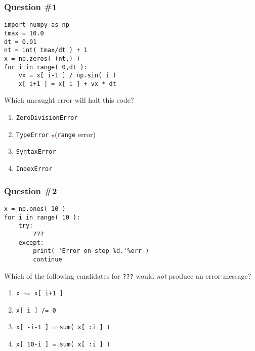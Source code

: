 \documentclass[11pt]{beamer}
\newcommand{\correctstar}{{\Large\textcolor{red}{$\star$}}}
\begin{document}
\begin{frame}[fragile]
  \frametitle{Question \#1}
  \Enlarge

  \begin{Verbatim}
import numpy as np
tmax = 10.0
dt = 0.01
nt = int( tmax/dt ) + 1
x = np.zeros( (nt,) )
for i in range( 0,dt ):
    vx = x[ i-1 ] / np.sin( i )
    x[ i+1 ] = x[ i ] + vx * dt
  \end{Verbatim}

Which uncaught error will halt this code?

  \begin{enumerate}[label=\Alph*]
    \item  \texttt{ZeroDivisionError}
    \item  \texttt{TypeError}  \correctstar  (\texttt{range} error)
    \item  \texttt{SyntaxError}
    \item  \texttt{IndexError}
  \end{enumerate}
\end{frame}

\begin{frame}[fragile]
  \frametitle{Question \#2}
  \Enlarge

  \begin{Verbatim}
x = np.ones( 10 )
for i in range( 10 ):
    try:
        ???
    except:
        print( 'Error on step %d.'%err )
        continue
  \end{Verbatim}

Which of the following candidates for \texttt{???} would \emph{not} produce an error message?

  \begin{enumerate}[label=\Alph*]
    \item  \texttt{x += x[ i+1 ]}
    \item  \texttt{x[ i ] /= 0}
    \item  \texttt{x[ -i-1 ]   = sum( x[ :i ] )}
    \item  \texttt{x[ 10-i ] = sum( x[ :i ] )}
  \end{enumerate}
\end{frame}
\end{document}
